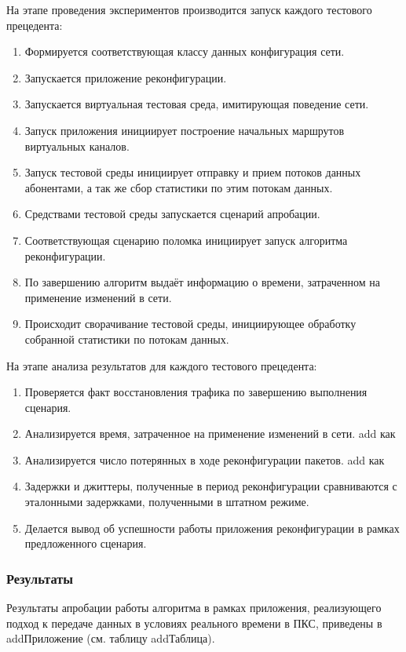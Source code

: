 \documentclass[12pt,fleqn]{article}
\begin{document}
На этапе проведения экспериментов производится запуск каждого тестового прецедента:
\begin{enumerate}
	\item Формируется соответствующая классу данных конфигурация сети.
	\item Запускается приложение реконфигурации.
	\item Запускается виртуальная тестовая среда, имитирующая поведение сети.
	\item Запуск приложения инициирует построение начальных маршрутов виртуальных каналов.
	\item Запуск тестовой среды инициирует отправку и прием потоков данных абонентами, а так же сбор статистики по этим потокам данных.
	\item Средствами тестовой среды запускается сценарий апробации.
	\item Соответствующая сценарию поломка инициирует запуск алгоритма реконфигурации.
	\item По завершению алгоритм выдаёт информацию о времени, затраченном на применение изменений в сети.
	\item Происходит сворачивание тестовой среды, инициирующее обработку собранной статистики по потокам данных.
\end{enumerate}

На этапе анализа результатов для каждого тестового прецедента:
\begin{enumerate}
	\item Проверяется факт восстановления трафика по завершению выполнения сценария.
	\item Анализируется время, затраченное на применение изменений в сети. add как
	\item Анализируется число потерянных в ходе реконфигурации пакетов. add как
	\item Задержки и джиттеры, полученные в период реконфигурации сравниваются с эталонными задержками, полученными в штатном режиме.
	\item Делается вывод об успешности работы приложения реконфигурации в рамках предложенного сценария.
\end{enumerate}

\subsubsection{Результаты}

Результаты апробации работы алгоритма в рамках приложения, реализующего подход к передаче данных в условиях реального времени в ПКС, приведены в addПриложение (см. таблицу addТаблица).
\end{document}
